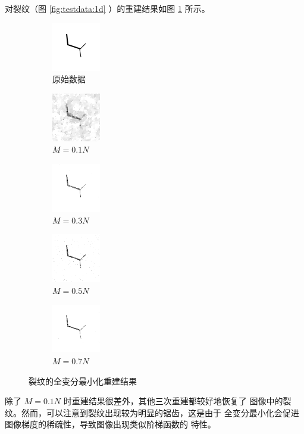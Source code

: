 对裂纹（图 \ref{fig:testdata:1d} ）的重建结果如图 \ref{fig:TV1d} 所示。

\begin{figure}
\centering
\begin{subfigure}[t]{1.1in}
	\includegraphics{Figure/testdata/1d.png}
	\caption{原始数据}
\end{subfigure}
\begin{subfigure}[t]{1.1in}
	\includegraphics{Figure/TV/1d10.png}
	\caption{$M = 0.1 N$}
\end{subfigure}
\begin{subfigure}[t]{1.1in}
	\includegraphics{Figure/TV/1d30.png}
	\caption{$M = 0.3 N$}
\end{subfigure}
\begin{subfigure}[t]{1.1in}
	\includegraphics{Figure/TV/1d50.png}
	\caption{$M = 0.5 N$}
\end{subfigure}
\begin{subfigure}[t]{1.1in}
	\includegraphics{Figure/TV/1d70.png}
	\caption{$M = 0.7 N$}
\end{subfigure}
\caption{裂纹的全变分最小化重建结果}
\label{fig:TV1d}
\end{figure}

除了 $M = 0.1N$ 时重建结果很差外，其他三次重建都较好地恢复了
图像中的裂纹。然而，可以注意到裂纹出现较为明显的锯齿，这是由于
全变分最小化会促进图像梯度的稀疏性，导致图像出现类似阶梯函数的
特性。

